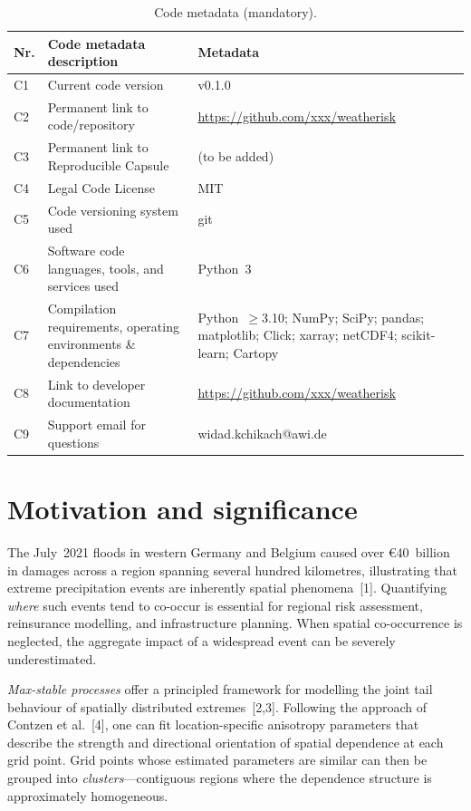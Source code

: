 \documentclass[preprint,12pt,a4paper]{elsarticle}
\begin{document}
\begin{table}[!h]
\begin{tabular}{|l|p{6.5cm}|p{6.5cm}|}
\hline
\textbf{Nr.} & \textbf{Code metadata description} & \textbf{Metadata} \\
\hline
C1 & Current code version & v0.1.0 \\
\hline
C2 & Permanent link to code/repository &
  \url{https://github.com/xxx/weatherisk} \\
\hline
C3 & Permanent link to Reproducible Capsule & (to be added) \\
\hline
C4 & Legal Code License & MIT \\
\hline
C5 & Code versioning system used & git \\
\hline
C6 & Software code languages, tools, and services used & Python~3 \\
\hline
C7 & Compilation requirements, operating environments
  \& dependencies &
  Python~$\geq$3.10; NumPy; SciPy; pandas; matplotlib;
  Click; xarray; netCDF4; scikit-learn; Cartopy \\
\hline
C8 & Link to developer documentation &
  \url{https://github.com/xxx/weatherisk} \\
\hline
C9 & Support email for questions & widad.kchikach@awi.de \\
\hline
\end{tabular}
\caption{Code metadata (mandatory).}
\label{tab:metadata}
\end{table}


\section{Motivation and significance}
\label{sec:motivation}

The July~2021 floods in western Germany and Belgium caused over
\euro{}40~billion in damages across a region spanning several hundred
kilometres, illustrating that extreme precipitation events are
inherently spatial phenomena~[1].  Quantifying \emph{where} such
events tend to co-occur is essential for regional risk assessment,
reinsurance modelling, and infrastructure planning.  When spatial
co-occurrence is neglected, the aggregate impact of a widespread
event can be severely underestimated.

\emph{Max-stable processes} offer a principled framework for
modelling the joint tail behaviour of spatially distributed
extremes~[2,3].  Following the approach of Contzen et al.~[4],
one can fit location-specific anisotropy parameters that describe
the strength and directional orientation of spatial dependence at
each grid point.  Grid points whose estimated parameters are
similar can then be grouped into \emph{clusters}---contiguous
regions where the dependence structure is approximately
homogeneous.
\end{document}
